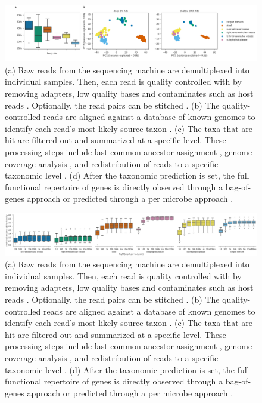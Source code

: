 \documentclass[conference,11pt]{IEEEtran}
\begin{document}
\begin{figure}[hbt]
    \centering
    \includegraphics[width=0.8\linewidth]{fig/hmp_beta.png}
    \caption{(a) Raw reads from the sequencing machine are demultiplexed into individual samples. Then, each read is quality controlled with by removing adapters, low quality bases and contaminates such as host reads \cite{consortium_structure_2012}. Optionally, the read pairs can be stitched \cite{magoc_flash:_2011}. (b) The quality-controlled reads are aligned against a database of known genomes to identify each read's most likely source taxon \cite{langmead_fast_2012}. (c) The taxa that are hit are filtered out and summarized at a specific level. These processing steps include last common ancestor assignment \cite{hong_pathoscope_2014}, genome coverage analysis \cite{wood_kraken:_2014}, and redistribution of reads to a specific taxonomic level \cite{lu_bracken:_2017}. (d) After the taxonomic prediction is set, the full functional repertoire of genes is directly observed through a bag-of-genes approach or predicted through a per microbe approach \cite{langille_predictive_2013}.}
      \label{fig:hmp_beta}
\end{figure}

\begin{figure}[hbt]
    \centering
    \includegraphics[width=0.8\linewidth]{fig/hmp_alpha.png}
    \caption{(a) Raw reads from the sequencing machine are demultiplexed into individual samples. Then, each read is quality controlled with by removing adapters, low quality bases and contaminates such as host reads \cite{consortium_structure_2012}. Optionally, the read pairs can be stitched \cite{magoc_flash:_2011}. (b) The quality-controlled reads are aligned against a database of known genomes to identify each read's most likely source taxon \cite{langmead_fast_2012}. (c) The taxa that are hit are filtered out and summarized at a specific level. These processing steps include last common ancestor assignment \cite{hong_pathoscope_2014}, genome coverage analysis \cite{wood_kraken:_2014}, and redistribution of reads to a specific taxonomic level \cite{lu_bracken:_2017}. (d) After the taxonomic prediction is set, the full functional repertoire of genes is directly observed through a bag-of-genes approach or predicted through a per microbe approach \cite{langille_predictive_2013}.}
      \label{fig:hmp_alpha}
\end{figure}
\end{document}
